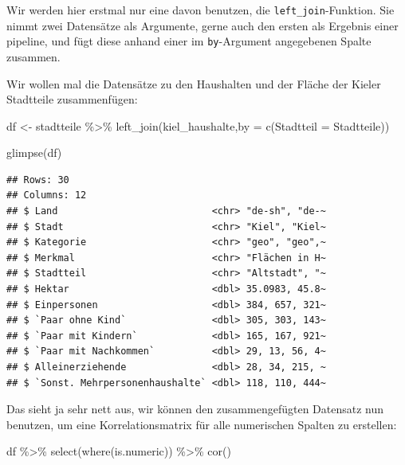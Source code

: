 \documentclass[
]{book}
\newenvironment{Shaded}{\begin{snugshade}}{\end{snugshade}}
\newcommand{\AttributeTok}[1]{\textcolor[rgb]{0.77,0.63,0.00}{#1}}
\newcommand{\FunctionTok}[1]{\textcolor[rgb]{0.00,0.00,0.00}{#1}}
\newcommand{\NormalTok}[1]{#1}
\newcommand{\OtherTok}[1]{\textcolor[rgb]{0.56,0.35,0.01}{#1}}
\newcommand{\SpecialCharTok}[1]{\textcolor[rgb]{0.00,0.00,0.00}{#1}}
\newcommand{\StringTok}[1]{\textcolor[rgb]{0.31,0.60,0.02}{#1}}
\begin{document}
Wir werden hier erstmal nur eine davon benutzen, die \texttt{left\_join}-Funktion. Sie nimmt zwei Datensätze als Argumente, gerne auch den ersten als Ergebnis einer pipeline, und fügt diese anhand einer im \texttt{by}-Argument angegebenen Spalte zusammen.

Wir wollen mal die Datensätze zu den Haushalten und der Fläche der Kieler Stadtteile zusammenfügen:

\begin{Shaded}
\begin{Highlighting}[]
\NormalTok{df }\OtherTok{\textless{}{-}}\NormalTok{ stadtteile }\SpecialCharTok{\%\textgreater{}\%} 
  \FunctionTok{left\_join}\NormalTok{(kiel\_haushalte,}\AttributeTok{by =} \FunctionTok{c}\NormalTok{(}\StringTok{\textquotesingle{}Stadtteil\textquotesingle{}} \OtherTok{=} \StringTok{\textquotesingle{}Stadtteile\textquotesingle{}}\NormalTok{))}

\FunctionTok{glimpse}\NormalTok{(df)}
\end{Highlighting}
\end{Shaded}

\begin{verbatim}
## Rows: 30
## Columns: 12
## $ Land                           <chr> "de-sh", "de-~
## $ Stadt                          <chr> "Kiel", "Kiel~
## $ Kategorie                      <chr> "geo", "geo",~
## $ Merkmal                        <chr> "Flächen in H~
## $ Stadtteil                      <chr> "Altstadt", "~
## $ Hektar                         <dbl> 35.0983, 45.8~
## $ Einpersonen                    <dbl> 384, 657, 321~
## $ `Paar ohne Kind`               <dbl> 305, 303, 143~
## $ `Paar mit Kindern`             <dbl> 165, 167, 921~
## $ `Paar mit Nachkommen`          <dbl> 29, 13, 56, 4~
## $ Alleinerziehende               <dbl> 28, 34, 215, ~
## $ `Sonst. Mehrpersonenhaushalte` <dbl> 118, 110, 444~
\end{verbatim}

Das sieht ja sehr nett aus, wir können den zusammengefügten Datensatz nun benutzen, um eine Korrelationsmatrix für alle numerischen Spalten zu erstellen:

\begin{Shaded}
\begin{Highlighting}[]
\NormalTok{df }\SpecialCharTok{\%\textgreater{}\%} 
  \FunctionTok{select}\NormalTok{(}\FunctionTok{where}\NormalTok{(is.numeric)) }\SpecialCharTok{\%\textgreater{}\%} 
  \FunctionTok{cor}\NormalTok{() }
\end{Highlighting}
\end{Shaded}
\end{document}
